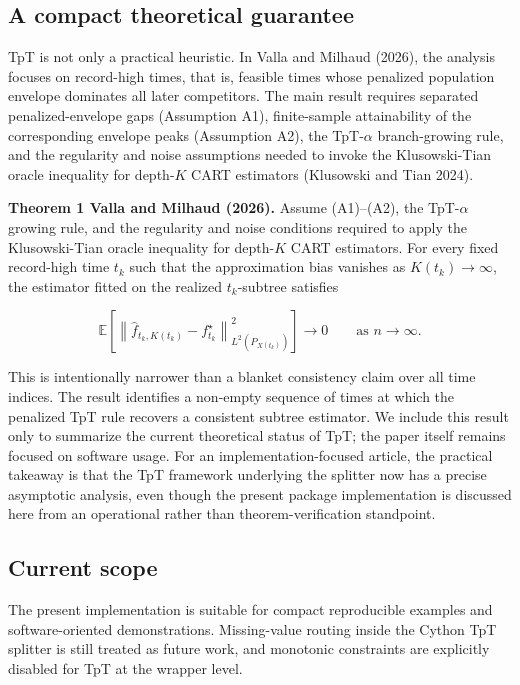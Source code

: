 \documentclass[
]{article}
\begin{document}
\subsection{A compact theoretical
guarantee}\label{a-compact-theoretical-guarantee}

TpT is not only a practical heuristic. In Valla and Milhaud (2026), the
analysis focuses on record-high times, that is, feasible times whose
penalized population envelope dominates all later competitors. The main
result requires separated penalized-envelope gaps (Assumption A1),
finite-sample attainability of the corresponding envelope peaks
(Assumption A2), the TpT-\(\alpha\) branch-growing rule, and the
regularity and noise assumptions needed to invoke the Klusowski-Tian
oracle inequality for depth-\(K\) CART estimators (Klusowski and Tian
2024).

\textbf{Theorem 1 Valla and Milhaud (2026).} Assume (A1)--(A2), the
TpT-\(\alpha\) growing rule, and the regularity and noise conditions
required to apply the Klusowski-Tian oracle inequality for depth-\(K\)
CART estimators. For every fixed record-high time \(t_k\) such that the
approximation bias vanishes as \(K(t_k) \to \infty\), the estimator
fitted on the realized \(t_k\)-subtree satisfies

\[
\mathbb{E}\!\left[\left\lVert \hat f_{t_k, K(t_k)} - f_{t_k}^{\star} \right\rVert^2_{L^2(P_{X(t_k)})}\right]
\longrightarrow 0
\qquad \text{as } n \to \infty.
\]

This is intentionally narrower than a blanket consistency claim over all
time indices. The result identifies a non-empty sequence of times at
which the penalized TpT rule recovers a consistent subtree estimator. We
include this result only to summarize the current theoretical status of
TpT; the paper itself remains focused on software usage. For an
implementation-focused article, the practical takeaway is that the TpT
framework underlying the splitter now has a precise asymptotic analysis,
even though the present package implementation is discussed here from an
operational rather than theorem-verification standpoint.

\subsection{Current scope}\label{current-scope}

The present implementation is suitable for compact reproducible examples
and software-oriented demonstrations. Missing-value routing inside the
Cython TpT splitter is still treated as future work, and monotonic
constraints are explicitly disabled for TpT at the wrapper level.
\end{document}
